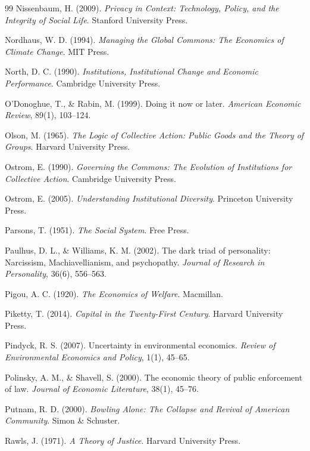 \begin{thebibliography}{99}
Nissenbaum, H. (2009).
\textit{Privacy in Context: Technology, Policy, and the Integrity of Social Life}.
Stanford University Press.

Nordhaus, W. D. (1994).
\textit{Managing the Global Commons: The Economics of Climate Change}.
MIT Press.

North, D. C. (1990).
\textit{Institutions, Institutional Change and Economic Performance}.
Cambridge University Press.

O'Donoghue, T., \& Rabin, M. (1999).
Doing it now or later.
\textit{American Economic Review}, 89(1), 103--124.

Olson, M. (1965).
\textit{The Logic of Collective Action: Public Goods and the Theory of Groups}.
Harvard University Press.

Ostrom, E. (1990).
\textit{Governing the Commons: The Evolution of Institutions for Collective Action}.
Cambridge University Press.

Ostrom, E. (2005).
\textit{Understanding Institutional Diversity}.
Princeton University Press.

Parsons, T. (1951).
\textit{The Social System}.
Free Press.

Paulhus, D. L., \& Williams, K. M. (2002).
The dark triad of personality: Narcissism, Machiavellianism, and psychopathy.
\textit{Journal of Research in Personality}, 36(6), 556--563.

Pigou, A. C. (1920).
\textit{The Economics of Welfare}.
Macmillan.

Piketty, T. (2014).
\textit{Capital in the Twenty-First Century}.
Harvard University Press.

Pindyck, R. S. (2007).
Uncertainty in environmental economics.
\textit{Review of Environmental Economics and Policy}, 1(1), 45--65.

Polinsky, A. M., \& Shavell, S. (2000).
The economic theory of public enforcement of law.
\textit{Journal of Economic Literature}, 38(1), 45--76.

Putnam, R. D. (2000).
\textit{Bowling Alone: The Collapse and Revival of American Community}.
Simon \& Schuster.

Rawls, J. (1971).
\textit{A Theory of Justice}.
Harvard University Press.


\end{thebibliography}
